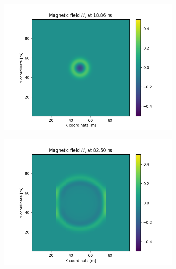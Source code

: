 \documentclass[12pt, oneside]{book}
\begin{document}
\begin{figure}[H]
    \centering
    \begin{subfigure}[b]{0.49\textwidth}
        \centering
        \includegraphics[width=\textwidth]{Imagenes/CFDTD2D_GaussianStability1.png}
    \end{subfigure}
    \begin{subfigure}[b]{0.49\textwidth}
        \centering
        \includegraphics[width=\textwidth]{Imagenes/CFDTD2D_GaussianStability2.png}
    \end{subfigure}


\end{figure}
\end{document}
